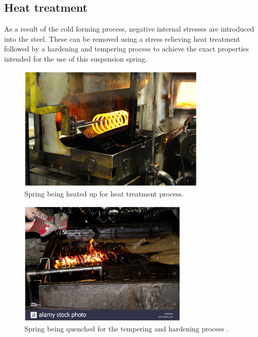 \documentclass[11pt]{article}
\begin{document}
\subsection{Heat treatment}
As a result of the cold forming process, negative internal stresses are introduced into the steel. These can be removed using a stress relieving heat treatment followed by a hardening and tempering process to achieve the exact properties intended for the use of this suspension spring.
\begin{figure}[H]
    \centering
    \includegraphics[height = 6cm]{./img/hotspring1.png}
    \caption{Spring being heated up for heat treatment process.}
    \label{fig:hotspring1}
\end{figure}
\begin{figure}[H]
    \centering
    \includegraphics[height = 6cm]{./img/hotspring2.png}
    \caption{Spring being quenched for the tempering and hardening process \cite{b6}.}
    \label{fig:hotspring2}
\end{figure}
\end{document}
